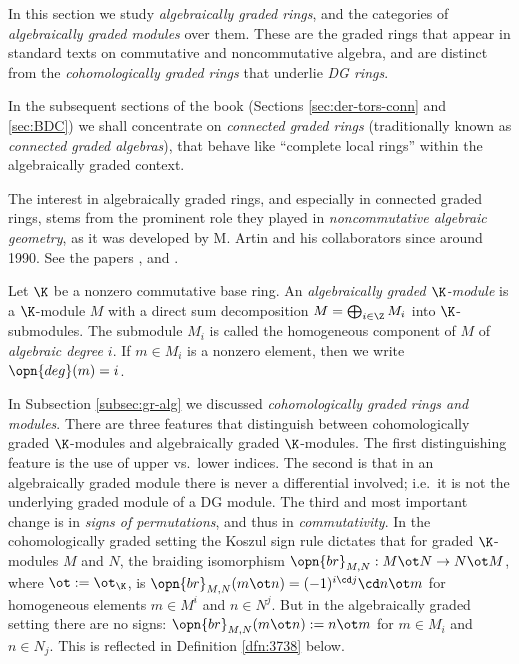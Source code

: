 


\renewcommand{\thisfile}{block6\_190328}  

\cleardoublepage
{}
\label{sec:alg-gra-rings}

\AYcopyright

In this section we study {\em algebraically graded rings}, and the categories 
of {\em algebraically graded modules} over them. These are the graded rings 
that appear in standard texts on commutative and noncommutative algebra, and 
are distinct from the {\em cohomologically graded rings} that underlie {\em DG 
rings}. 

In the subsequent sections of the book (Sections \ref{sec:der-tors-conn} and 
\ref{sec:BDC}) we shall concentrate on {\em connected graded rings}
(traditionally known as {\em connected graded algebras}), that behave 
like ``complete local rings'' within the algebraically graded context. 

The interest in algebraically graded rings, and especially in connected graded 
rings, stems from the prominent role they played in {\em noncommutative 
algebraic geometry}, as it was developed by M. Artin and his collaborators 
since around 1990. See the papers \cite{ATV}, \cite{ArZh} and \cite{StaVdB}. 



\label{subsec:alg-gr-mods}

Let $\K$ be a nonzero commutative base ring. An 
{\em algebraically graded $\K$-module}%
is a $\K$-module $M$ with a direct sum decomposition 
$M = \bigoplus_{i \in \Z} M_i$
into $\K$-submodules. The submodule $M_i$ is called the homogeneous component 
of $M$ of {\em algebraic degree $i$}.
If $m \in M_i$ is a nonzero element, then we write 
$\opn{deg}(m) = i$. 

In Subsection \ref{subsec:gr-alg} we discussed {\em cohomologically graded rings 
and  modules}. There are three features that distinguish between 
cohomologically graded $\K$-mod\-ules and algebraically graded $\K$-modules.
The first distinguishing feature is the use of upper vs.\ lower 
indices. The second is that in an algebraically graded module 
there is never a differential involved; i.e.\ it is 
not the underlying graded module of a DG module. The third and most important 
change is in {\em signs of permutations}, and thus in {\em commutativity}. In 
the cohomologically graded setting the Koszul sign rule 
dictates that for graded $\K$-modules $M$ and $N$, the braiding isomorphism
$\opn{br}_{M, N} : M \ot N \to N \ot M$,
where $\ot := \ot_{\K}$, is 
$\opn{br}_{M, N}(m \ot n) = (-1)^{i \cd j} \cd n \ot m$
for homogeneous elements $m \in M^i$ and $n \in N^j$. 
But in the algebraically graded setting there are no signs: 
$\opn{br}_{M, N}(m \ot n) := n \ot m$
for $m \in M_i$ and $n \in N_j$. 
This is reflected in Definition \ref{dfn:3738} below. 

